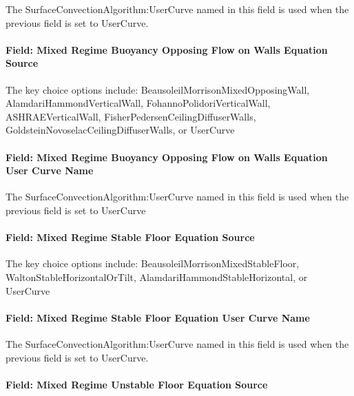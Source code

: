 The SurfaceConvectionAlgorithm:UserCurve named in this field is used when the previous field is set to UserCurve.

\paragraph{Field: Mixed Regime Buoyancy Opposing Flow on Walls Equation Source}\label{field-mixed-regime-buoyancy-oppossing-flow-on-walls-equation-source}

The key choice options include: BeausoleilMorrisonMixedOpposingWall, AlamdariHammondVerticalWall, FohannoPolidoriVerticalWall, ASHRAEVerticalWall, FisherPedersenCeilingDiffuserWalls, GoldsteinNovoselacCeilingDiffuserWalls, or UserCurve

\paragraph{Field: Mixed Regime Buoyancy Opposing Flow on Walls Equation User Curve Name}\label{field-mixed-regime-buoyancy-oppossing-flow-on-walls-equation-user-curve-name}

The SurfaceConvectionAlgorithm:UserCurve named in this field is used when the previous field is set to UserCurve

\paragraph{Field: Mixed Regime Stable Floor Equation Source}\label{field-mixed-regime-stable-floor-equation-source}

The key choice options include: BeausoleilMorrisonMixedStableFloor, WaltonStableHorizontalOrTilt, AlamdariHammondStableHorizontal, or UserCurve

\paragraph{Field: Mixed Regime Stable Floor Equation User Curve Name}\label{field-mixed-regime-stable-floor-equation-user-curve-name}

The SurfaceConvectionAlgorithm:UserCurve named in this field is used when the previous field is set to UserCurve.

\paragraph{Field: Mixed Regime Unstable Floor Equation Source}\label{field-mixed-regime-unstable-floor-equation-source}

